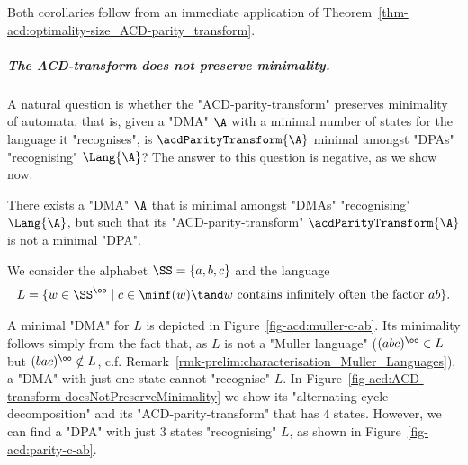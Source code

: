 \documentclass{theoretics}
\begin{document}
Both corollaries follow from an immediate application of Theorem~\ref{thm-acd:optimality-size_ACD-parity_transform}.


\subparagraph*{The ACD-transform does not preserve minimality.}

A natural question is whether the "ACD-parity-transform" preserves minimality of automata, that is, given a "DMA" $\A$ with a minimal number of states for the language it "recognises", is $\acdParityTransform{\A}$ minimal amongst "DPAs" "recognising" $\Lang{\A}$?\footnotemark{} The answer to this question is negative, as we show now. %

\begin{proposition}
	There exists a "DMA" $\A$ that is minimal amongst "DMAs" "recognising" $\Lang{\A}$, but such that its "ACD-parity-transform" $\acdParityTransform{\A}$ is not a minimal "DPA".
\end{proposition}

We consider the alphabet $\SS=\{a,b,c\}$ and the language 
\[ L = \{ w\in \SS^\oo \mid c\in \minf(w) \tand w \text{ contains infinitely often the factor } ab\}. \]

A minimal "DMA" for $L$ is depicted in Figure~\ref{fig-acd:muller-c-ab}. Its minimality follows simply from the fact that, as $L$ is not a "Muller language" ($(abc)^\oo\in L$ but $(bac)^\oo\notin L$, c.f. Remark~\ref{rmk-prelim:characterisation_Muller_Languages}), a "DMA" with just one state cannot "recognise" $L$. In Figure~\ref{fig-acd:ACD-transform-doesNotPreserveMinimality} we show its "alternating cycle decomposition" and its "ACD-parity-transform" that has $4$ states. However, we can find a "DPA" with just $3$ states "recognising" $L$, as shown in Figure~\ref{fig-acd:parity-c-ab}.
\end{document}
